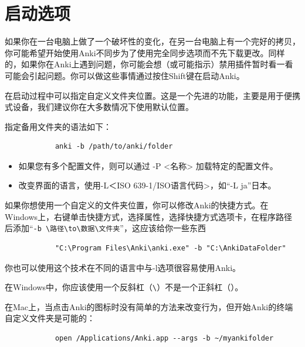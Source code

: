 \documentclass[a4paper]{book}
\begin{document}
		
		\section{启动选项}
		
		如果你在一台电脑上做了一个破坏性的变化，在另一台电脑上有一个完好的拷贝，你可能希望开始使用Anki不同步为了使用完全同步选项而不先下载更改。同样的，如果你在Anki上遇到问题，你可能会想（或可能指示）禁用插件暂时看一看可能会引起问题。你可以做这些事情通过按住Shift键在启动Anki。
		
		在启动过程中可以指定自定义文件夹位置。这是一个先进的功能，主要是用于便携式设备，我们建议你在大多数情况下使用默认位置。
		
		指定备用文件夹的语法如下：
		
		\begin{shaded}\begin{verbatim}
			anki -b /path/to/anki/folder
			\end{verbatim}\end{shaded}
		
		\begin{itemize}
			\itemsep1pt\parskip0pt
			\item 如果您有多个配置文件，则可以通过 -P <名称> 加载特定的配置文件。
			\item 改变界面的语言，使用-L＜ISO 639-1/ISO语言代码>，如“-L ja”日本。
		\end{itemize}
		
		如果你想使用一个自定义的文件夹位置，你可以修改Anki的快捷方式。在Windows上，右键单击快捷方式，选择属性，选择快捷方式选项卡，在程序路径后添加“\verb|-b \路径\to\数据\文件夹|”，这应该给你一些东西
		
		\begin{shaded}\begin{verbatim}
			"C:\Program Files\Anki\anki.exe" -b "C:\AnkiDataFolder"
			\end{verbatim}\end{shaded}
		
		你也可以使用这个技术在不同的语言中与-l选项很容易使用Anki。
		
		\begin{shaded}
			在Windows中，你应该使用一个反斜杠（\verb|\|）不是一个正斜杠（\/）。
		\end{shaded}
		
		在Mac上，当点击Anki的图标时没有简单的方法来改变行为，但开始Anki的终端自定义文件夹是可能的：
		
		\begin{shaded}\begin{verbatim}
			open /Applications/Anki.app --args -b ~/myankifolder
			\end{verbatim}\end{shaded}
		
\end{document}
